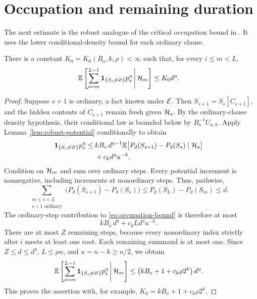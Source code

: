 \section{Occupation and remaining duration}
\label{sec:occupation}

The next estimate is the robust analogue of the critical occupation bound
in \citet{OpenAI2026ThreeSATVariance}.  It uses the lower conditional-density
bound for each ordinary clause.

\begin{lemma}
\label{lem:occupation}
There is a constant $K_0=K_0(B_{\mathrm{o}},k,\rho)<\infty$ such that, for every
$i\le m<L$,
\begin{equation}
    \mathbb E\left[
      \sum_{s=m}^{L-1}
        \mathbf 1_{\{S_s\ne\varnothing\}}p_s^\eta
      \,\middle|\,\mathcal H_m
    \right]
    \le K_0d^\eta.
    \label{eq:occupation-bound}
\end{equation}
\end{lemma}

\begin{proof}
Suppose $s+1$ is ordinary, a fact known under $\mathcal E$.  Then
$S_{s+1}=S_s[C_{s+1}]$, and the hidden contents of $C_{s+1}$ remain fresh
given $\mathcal H_s$.  By the ordinary-clause density hypothesis, their conditional law is
bounded below by $B_{\mathrm{o}}^{-1}U_{u,k}$.  Apply
Lemma~\ref{lem:robust-potential} conditionally to obtain
\begin{align}
    \mathbf 1_{\{S_s\ne\varnothing\}}p_s^\eta
    \le{}&
    kB_{\mathrm{o}}\,d^{\eta-1}
      \mathbb E\bigl[P_d(S_{s+1})-P_d(S_s)\mid\mathcal H_s\bigr]
      \notag\\
    &+c_kd^\eta u^{-k}.
    \label{eq:conditional-drift}
\end{align}
Condition on $\mathcal H_m$ and sum over ordinary steps.  Every potential
increment is nonnegative, including increments at nonordinary steps.  Thus,
pathwise,
\[
    \sum_{\substack{m\le s<L\\s+1\text{ ordinary}}}
       \bigl(P_d(S_{s+1})-P_d(S_s)\bigr)
    \le P_d(S_L)-P_d(S_m)
    \le d.
\]
The ordinary-step contribution to \eqref{eq:occupation-bound} is therefore
at most
\[
    kB_{\mathrm{o}}\,d^\eta+c_kLd^\eta u^{-k}.
\]
There are at most $Z$ remaining steps, because every nonordinary index
strictly after $i$ meets at least one root.  Each remaining summand is at
most one.  Since $Z\le d\le d^\eta$, $L\le\rho n$, and $u=n-k\ge n/2$,
we obtain
\[
    \mathbb E\left[
      \sum_{s=m}^{L-1}
        \mathbf 1_{\{S_s\ne\varnothing\}}p_s^\eta
      \,\middle|\,\mathcal H_m
    \right]
    \le
    \left(kB_{\mathrm{o}}+1+c_k\rho 2^k\right)d^\eta.
\]
This proves the assertion with, for example,
$K_0=kB_{\mathrm{o}}+1+c_k\rho2^k$.
\end{proof}

